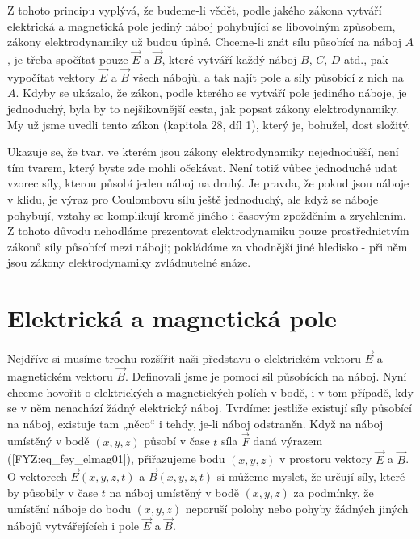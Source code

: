     Z tohoto principu vyplývá, že budeme-li vědět, podle jakého zákona vytváří elektrická a 
    magnetická pole jediný náboj pohybující se libovolným způsobem, zákony elektrodynamiky už budou 
    úplné. Chceme-li znát sílu působící na náboj \(A\), je třeba spočítat pouze \(\vec{E}\) a 
    \(\vec{B}\), které vytváří každý náboj \(B\), \(C\), \(D\) atd., pak vypočítat vektory 
    \(\vec{E}\) a \(\vec{B}\) všech nábojů, a tak najít  pole a síly působící z nich na \(A\). Kdyby 
    se ukázalo, že zákon, podle kterého se vytváří pole jediného náboje, je jednoduchý, byla by to 
    nejšikovnější cesta, jak popsat zákony elektrodynamiky. My už jsme uvedli tento zákon (kapitola 
    28, díl 1), který je, bohužel, dost složitý.
    
    Ukazuje se, že tvar, ve kterém jsou zákony elektrodynamiky nejednodušší, není tím tvarem, který 
    byste zde mohli očekávat. Není totiž vůbec jednoduché udat vzorec síly, kterou působí jeden 
    náboj na druhý. Je pravda, že pokud jsou náboje v klidu, je výraz pro Coulombovu sílu ještě 
    jednoduchý, ale když se náboje pohybují, vztahy se komplikují kromě jiného i časovým zpožděním a 
    zrychlením. Z tohoto důvodu nehodláme prezentovat elektrodynamiku pouze prostřednictvím zákonů 
    síly působící mezi náboji; pokládáme za vhodnější jiné hledisko - při něm jsou zákony 
    elektrodynamiky zvládnutelné snáze.
    
    \section{Elektrická a magnetická pole}
      Nejdříve si musíme trochu rozšířit naši představu o elektrickém vektoru \(\vec{E}\) a 
      magnetickém vektoru \(\vec{B}\). Definovali jsme je pomocí sil působících na náboj. Nyní 
      chceme hovořit o elektrických a magnetických polích v bodě, i v tom případě, kdy se v něm 
      nenachází žádný elektrický náboj. Tvrdíme: jestliže existují síly působící na náboj, existuje 
      tam „něco“ i tehdy, je-li náboj odstraněn. Když na náboj umístěný v bodě \((x, y, z)\) působí 
      v čase \(t\) síla \(\vec{F}\) daná výrazem (\ref{FYZ:eq_fey_elmag01}), přiřazujeme bodu \((x, 
      y, z)\) v prostoru vektory \(\vec{E}\) a \(\vec{B}\). O vektorech \(\vec{E}(x,y, z, t)\) a 
      \(\vec{B}(x, y, z, t)\) si můžeme myslet, že určují síly, které by působily v čase \(t\) na 
      náboj umístěný v bodě \((x, y, z)\) za podmínky, že umístění náboje do bodu \((x, y, z)\) 
      neporuší polohy nebo pohyby žádných jiných nábojů vytvářejících i pole \(\vec{E}\) a 
      \(\vec{B}\).
    

